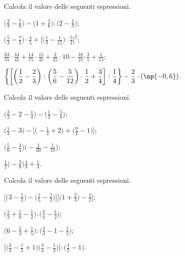 \begin{esercizio}[\Ast]
 \label{ese:3.135}
 Calcola il valore delle seguenti espressioni.
\begin{enumeratea}
\spazielenx
\item $\displaystyle{\bigg(\frac{2}{3}-\frac{7}{6}\bigg)-\bigg(1+\frac{5}{6}\bigg):\bigg(2-\frac{1}{3}\bigg)}$;
\item $\displaystyle{\bigg(\frac{5}{3}-\frac{7}{2}\bigg)\cdot\frac{4}{5}+\bigg[\bigg(\frac{1}{3}-\frac{1}{15}\bigg)%
\cdot\frac{5}{2}\bigg]^{2}}$;
\item $\displaystyle{\frac{63}{55}\cdot\frac{44}{45}+\frac{14}{75}\cdot\frac{15}{35}+\frac{2}{25}\cdot%
10-\frac{16}{25}:\frac{3}{5}+\frac{1}{15}}$;
\item $\displaystyle{\bigg\{\bigg[\bigg(\frac{1}{2}-\frac{2}{3}\bigg):\bigg(\frac{5}{6}-\frac{5}{12}\bigg)\cdot%
\frac{1}{2}+\frac{3}{4}\bigg]:\frac{1}{4}\bigg\}-\frac{2}{3}\cdot(\np{-0,6})}$.
\end{enumeratea}
\end{esercizio}

\begin{esercizio}[\Ast]
 \label{ese:3.136}
 Calcola il valore delle seguenti espressioni.
\begin{multicols}{2}
\begin{enumeratea}
\spazielenx
\item $\displaystyle{\bigg(\frac{3}{2}-2-\frac{1}{4}\bigg)-\bigg(\frac{1}{2}-\frac{5}{4}\bigg)}$;
\item $\displaystyle{\bigg(\frac{1}{3}-3\bigg)-\bigg[\bigg(-\frac{1}{2}+2\bigg)+\bigg(\frac{9}{2}-1\bigg)\bigg]}$;
\item $\displaystyle{\bigg(\frac{5}{6}-\frac{3}{4}\bigg)\bigg(-\frac{1}{20}-\frac{1}{10}\bigg)}$;
\item $\displaystyle{\frac{1}{2}\bigg(-\frac{3}{8}\bigg)\frac{4}{3}+\frac{1}{4}}$.
\end{enumeratea}
\end{multicols}
\end{esercizio}
\begin{esercizio}[\Ast]
 \label{ese:3.137}
 Calcola il valore delle seguenti espressioni.
\begin{multicols}{2}
\begin{enumeratea}
\spazielenx
\item $\displaystyle{\bigg[\bigg(3-\frac{1}{2}\bigg)-\bigg(\frac{1}{5}-\frac{1}{2}\bigg)\bigg]\bigg[\bigg(1+\frac{2}{3}\bigg)-\frac{1}{2}\bigg]}$;
\item $\displaystyle{\bigg(\frac{1}{3}+\frac{1}{6}-\frac{1}{2}\bigg):\bigg(\frac{3}{4}-\frac{1}{2}\bigg)}$;
\item $\displaystyle{\bigg(6-\frac{2}{3}+\frac{1}{5}\bigg):\bigg(\frac{2}{3}-1-\frac{1}{5}\bigg)}$;
\item $\displaystyle{\bigg[\bigg(\frac{2}{3}-\frac{1}{5}+1\bigg)\bigg(\frac{3}{4}-\frac{1}{2}\bigg)\bigg]:\bigg(\frac{4}{3}-1\bigg)}$.
\end{enumeratea}
\end{multicols}
\end{esercizio}

